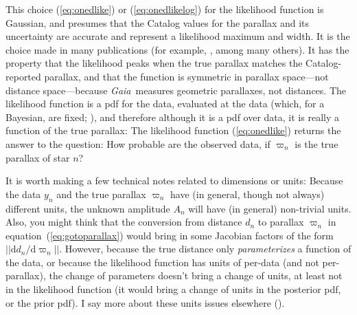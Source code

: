 \documentclass[12pt, modern]{aastex62h}
\newcommand{\Gaia}{\textsl{Gaia}}
\newcommand{\equationname}{equation}
\newcommand{\dd}{\mathrm{d}}
\begin{document}
This choice (\ref{eq:onedlike}) or (\ref{eq:onedlikelog}) for the likelihood function is Gaussian,
and presumes that the
Catalog values for the parallax and its uncertainty are accurate and represent
a likelihood maximum and width.
It is the choice made in many publications (for example, \citealt{tri2, leistedt, hawkins, lin}, among many others).
It has the property that the likelihood peaks when the true parallax
matches the Catalog-reported parallax,
and that the function is symmetric in parallax space---not distance space---because
\Gaia\ measures geometric parallaxes, not distances.
The likelihood function is a pdf for the data, evaluated at the data (which,
for a Bayesian, are fixed; \citealt{jaynes}), and therefore although it is a pdf over data,
it is really a function of the true parallax:
The likelihood function (\ref{eq:onedlike}) returns the answer to the question:
How probable are the observed data, if $\varpi_n$ is the true parallax of
star $n$?

It is worth making a few technical notes related to dimensions or units:
Because the data $y_n$ and
the true parallax $\varpi_n$ have (in general, though not always) different units,
the unknown amplitude $A_n$ will have (in general) non-trivial units.
Also, you might think
that the conversion from distance $d_n$ to parallax $\varpi_n$
in \equationname~(\ref{eq:gotoparallax})
would bring in some Jacobian factors of the form $||\dd d_n/\dd\varpi_n||$.
However, because the true distance only \emph{parameterizes} a function of the data,
or because the likelihood function has units of per-data (and not per-parallax),
the change of parameters doesn't bring a change of units, at least not in the
likelihood function (it would bring a change of units in the posterior pdf, or the
prior pdf).
I say more about these units issues elsewhere (\citealt{calculus}).
\end{document}
